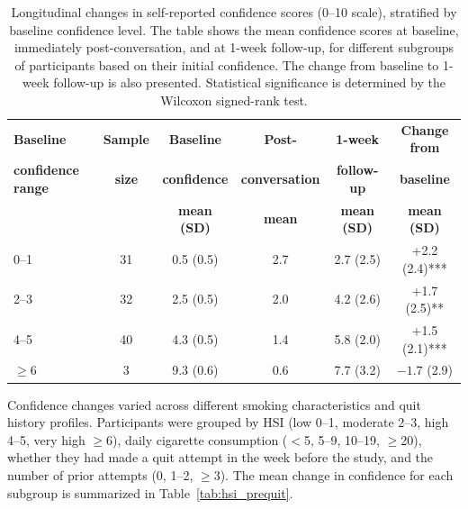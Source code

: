 \begin{table}[ht!]
  \centering
  \small
  \renewcommand{\arraystretch}{1.1}
  \begin{tabular*}{\linewidth}{@{\extracolsep{\fill}}lccccc@{}}
    \toprule
    \textbf{Baseline} & \textbf{Sample} & \textbf{Baseline} & \textbf{Post-} & \textbf{1-week} & \textbf{Change from} \\
    \textbf{confidence range} & \textbf{size} & \textbf{confidence} & \textbf{conversation} & \textbf{follow-up} & \textbf{baseline} \\
    & & \textbf{mean (SD)} & \textbf{mean} & \textbf{mean (SD)} & \textbf{mean (SD)} \\
    \midrule
    0--1   & 31 & 0.5 (0.5) & 2.7 & 2.7 (2.5) & +2.2 (2.4)*** \\
    2--3   & 32 & 2.5 (0.5) & 2.0 & 4.2 (2.6) & +1.7 (2.5)** \\
    4--5   & 40 & 4.3 (0.5) & 1.4 & 5.8 (2.0) & +1.5 (2.1)*** \\
    $\geq$6 & 3 & 9.3 (0.6) & 0.6 & 7.7 (3.2) & $-1.7$ (2.9) \\
    \bottomrule
  \end{tabular*}
  \caption[Confidence Changes by Baseline Confidence]{Longitudinal changes in self-reported confidence scores (0--10 scale), stratified by baseline confidence level. The table shows the mean confidence scores at baseline, immediately post-conversation, and at 1-week follow-up, for different subgroups of participants based on their initial confidence. The change from baseline to 1-week follow-up is also presented. Statistical significance is determined by the Wilcoxon signed-rank test.}
  \label{tab:baseline_confidence}
\end{table}




Confidence changes varied across different smoking characteristics and quit history profiles. Participants were grouped by HSI (low 0--1, moderate 2--3, high 4--5, very high $\geq$6), daily cigarette consumption ($<$5, 5--9, 10--19, $\geq$20), whether they had made a quit attempt in the week before the study, and the number of prior attempts (0, 1--2, $\geq$3). The mean change in confidence for each subgroup is summarized in Table~\ref{tab:hsi_prequit}.

